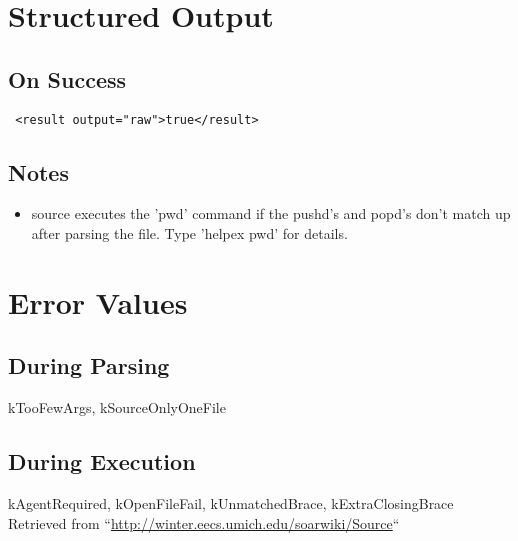 \documentclass[10pt]{article}
\begin{document}
\section*{ Structured Output }
\subsection*{ On Success }
\begin{verbatim}
 <result output="raw">true</result>

\end{verbatim}
\subsection*{ Notes }
\begin{itemize}
\item  source executes the 'pwd' command if the pushd's and popd's don't match up after parsing the file. Type 'helpex pwd' for details. 

\end{itemize}
\section*{ Error Values }
\subsection*{ During Parsing }


 kTooFewArgs, kSourceOnlyOneFile
\subsection*{ During Execution }


 kAgentRequired, kOpenFileFail, kUnmatchedBrace, kExtraClosingBrace Retrieved from ``\url{http://winter.eecs.umich.edu/soarwiki/Source}``
\end{document}
